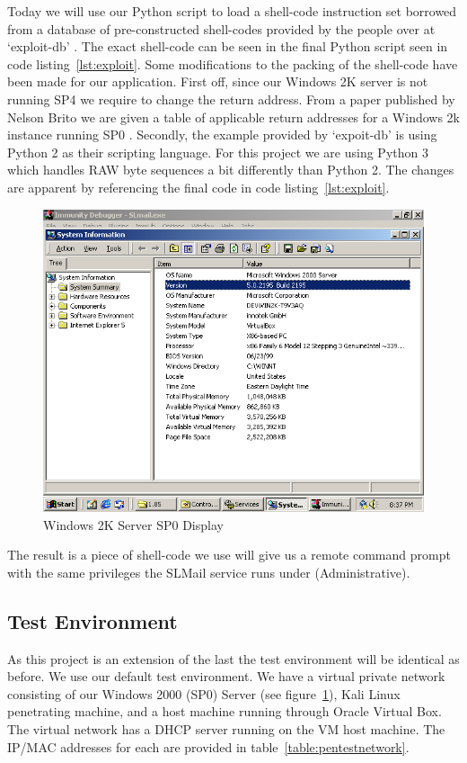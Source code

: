 \documentclass[12pt]{article}
\begin{document}
Today we will use our Python script to load a shell-code instruction set
borrowed from a database of pre-constructed shell-codes provided by the
people over at `exploit-db' \cite{Muts}. The exact shell-code can be seen 
in the final Python script seen in code listing~\ref{lst:exploit}. Some 
modifications to the packing of the shell-code have been made for our 
application. First off, since our Windows 2K server is not running SP4 
we require to change the return address. From a paper published by Nelson 
Brito we are given a table of applicable return addresses for a Windows 2k 
instance running SP0 \cite{Brito2008}. Secondly, the example provided by 
`expoit-db' is using Python 2 as their scripting language. For this project 
we are using Python 3 which handles RAW byte sequences a bit differently 
than Python 2. The changes are apparent by referencing the final code in 
code listing~\ref{lst:exploit}.

\begin{figure}[ht]
    \centering
    \includegraphics[width=5.5in]{images/20160504_win2ksp0.png}
    \caption{Windows 2K Server SP0 Display}
    \label{fig:win2ksp0}
\end{figure}

The result is a piece of shell-code we use will give us a remote command 
prompt with the same privileges the SLMail service runs under 
(Administrative). 

\subsection{Test Environment}
\label{sec:testenv}
As this project is an extension of the last the test environment will be 
identical as before. We use our default test environment. We have a virtual 
private network consisting of our Windows 2000 (SP0) Server 
(see figure~\ref{fig:win2ksp0}), Kali Linux penetrating machine, and a 
host machine running through Oracle Virtual Box. The virtual network has 
a DHCP server running on the VM host machine. The IP/MAC addresses for 
each are provided in table~\ref{table:pentestnetwork}.
\end{document}
